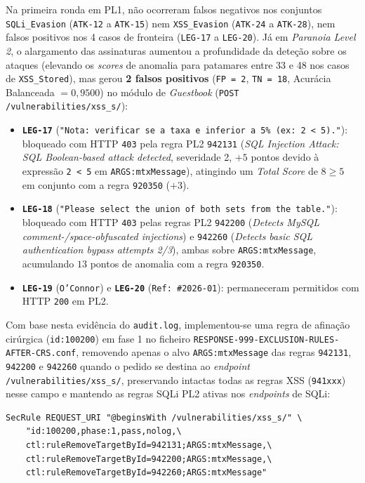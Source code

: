 \documentclass[11pt,a4paper]{article}
\begin{document}
\newpage
Na primeira ronda em PL1, não ocorreram falsos negativos nos conjuntos \texttt{SQLi\_Evasion} (\texttt{ATK-12} a \texttt{ATK-15}) nem \texttt{XSS\_Evasion} (\texttt{ATK-24} a \texttt{ATK-28}), nem falsos positivos nos 4 casos de fronteira (\texttt{LEG-17} a \texttt{LEG-20}). Já em \textit{Paranoia Level 2}, o alargamento das assinaturas aumentou a profundidade da deteção sobre os ataques (elevando os \textit{scores} de anomalia para patamares entre 33 e 48 nos casos de \texttt{XSS\_Stored}), mas gerou \textbf{2 falsos positivos} (\texttt{FP = 2}, \texttt{TN = 18}, Acurácia Balanceada $= 0{,}9500$) no módulo de \textit{Guestbook} (\texttt{POST /vulnerabilities/xss\_s/}):
\begin{itemize}
    \item \textbf{\texttt{LEG-17}} (\texttt{"Nota: verificar se a taxa e inferior a 5\% (ex: 2 < 5)."}): bloqueado com HTTP \texttt{403} pela regra PL2 \texttt{942131} (\textit{SQL Injection Attack: SQL Boolean-based attack detected}, severidade 2, $+5$ pontos devido à expressão \texttt{2 < 5} em \texttt{ARGS:mtxMessage}), atingindo um \textit{Total Score} de $8 \geq 5$ em conjunto com a regra \texttt{920350} ($+3$).
    \item \textbf{\texttt{LEG-18}} (\texttt{"Please select the union of both sets from the table."}): bloqueado com HTTP \texttt{403} pelas regras PL2 \texttt{942200} (\textit{Detects MySQL comment-/space-obfuscated injections}) e \texttt{942260} (\textit{Detects basic SQL authentication bypass attempts 2/3}), ambas sobre \texttt{ARGS:mtxMessage}, acumulando $13$ pontos de anomalia com a regra \texttt{920350}.
    \item \textbf{\texttt{LEG-19}} (\texttt{O'Connor}) e \textbf{\texttt{LEG-20}} (\texttt{Ref: \#2026-01}): permaneceram permitidos com HTTP \texttt{200} em PL2.
\end{itemize}

Com base nesta evidência do \texttt{audit.log}, implementou-se uma regra de afinação cirúrgica (\texttt{id:100200}) em fase 1 no ficheiro \texttt{RESPONSE-999-EXCLUSION-RULES-AFTER-CRS.conf}, removendo apenas o alvo \texttt{ARGS:mtxMessage} das regras \texttt{942131}, \texttt{942200} e \texttt{942260} quando o pedido se destina ao \textit{endpoint} \texttt{/vulnerabilities/xss\_s/}, preservando intactas todas as regras XSS (\texttt{941xxx}) nesse campo e mantendo as regras SQLi PL2 ativas nos \textit{endpoints} de SQLi:

\begin{lstlisting}[caption={Regra de afinação aplicada em \texttt{SRC/\allowbreak modsecurity/\allowbreak RESPONSE-999-\allowbreak EXCLUSION-RULES-\allowbreak AFTER-CRS.conf}.},label={lst:tuning_pl2}]
SecRule REQUEST_URI "@beginsWith /vulnerabilities/xss_s/" \
    "id:100200,phase:1,pass,nolog,\
    ctl:ruleRemoveTargetById=942131;ARGS:mtxMessage,\
    ctl:ruleRemoveTargetById=942200;ARGS:mtxMessage,\
    ctl:ruleRemoveTargetById=942260;ARGS:mtxMessage"
\end{lstlisting}
\end{document}
